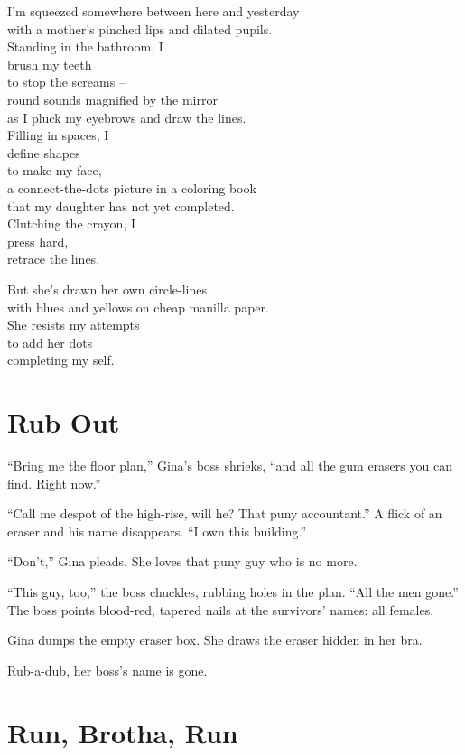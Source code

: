 \documentclass[twoside,10pt]{book}
\begin{document}
I'm squeezed somewhere between here and yesterday\\
with a mother's pinched lips and dilated pupils.\\
Standing in the bathroom, I\\
brush my teeth\\
to stop the screams --\\
round sounds magnified by the mirror\\
as I pluck my eyebrows and draw the lines.\\
Filling in spaces, I\\
define shapes\\
to make my face,\\
a connect-the-dots picture in a coloring book\\
that my daughter has not yet completed.\\
Clutching the crayon, I\\
press hard,\\
retrace the lines.

But she's drawn her own circle-lines\\
with blues and yellows on cheap manilla paper.\\
She resists my attempts\\
to add her dots\\
completing my self.


\clearpage
\section{Rub Out}

``Bring me the floor plan,'' Gina's boss shrieks, ``and all the gum
erasers you can find. Right now.''

``Call me despot of the high-rise, will he? That puny accountant.'' A
flick of an eraser and his name disappears. ``I own this building.''

``Don't,'' Gina pleads. She loves that puny guy who is no more.

``This guy, too,'' the boss chuckles, rubbing holes in the plan. ``All
the men gone.'' The boss points blood-red, tapered nails at the
survivors' names: all females.

Gina dumps the empty eraser box. She draws the eraser hidden in her bra.

Rub-a-dub, her boss's name is gone.


\clearpage
\section{Run, Brotha, Run}
\end{document}
